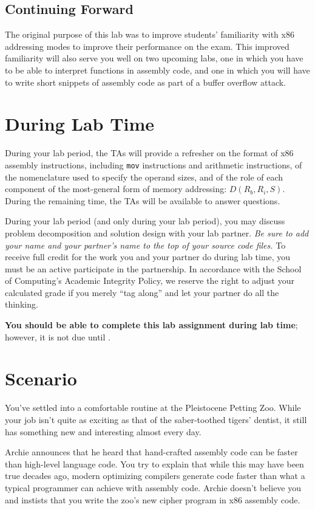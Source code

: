 \subsection*{Continuing Forward}

The original purpose of this lab was to improve students' familiarity with
x86 addressing modes to improve their performance on the exam. This improved
familiarity will also serve you well on two upcoming labs, one in which you have
to be able to interpret functions in assembly code, and one in which you will
have to write short snippets of assembly code as part of a buffer overflow
attack.

\section*{During Lab Time}

During your lab period, the TAs will provide a refresher on the format of x86
assembly instructions, including \texttt{mov} instructions and arithmetic instructions, of the nomenclature used to specify the operand sizes, and of the role of each component of the most-general
form of memory addressing: $D(R_b, R_i, S)$. During the remaining time, the TAs
will be available to answer questions.

During your lab period (and only during your lab period), you may discuss problem decomposition and solution design with your lab partner.
\textit{Be sure to add your name and your partner's name to the top of your source code files.}
To receive full credit for the work you and your partner do during lab time, you must be an active participate in the partnership.
In accordance with the School of Computing's Academic Integrity Policy, we reserve the right to adjust your calculated grade if you merely ``tag along'' and let your partner do all the thinking.

\textbf{You should be able to complete this lab assignment during lab time};
however, it is not due until \duedate.

\section*{Scenario}

You've settled into a comfortable routine at the Pleistocene Petting Zoo. While
your job isn't quite as exciting as that of the saber-toothed tigers' dentist,
it still has something new and interesting almost every day.

Archie announces that he heard that hand-crafted assembly code can be faster
than high-level language code. You try to explain that while this may have been
true decades ago, modern optimizing compilers generate code faster than what a
typical programmer can achieve with assembly code. Archie doesn't believe you
and instists that you write the zoo's new cipher program in x86 assembly code.

